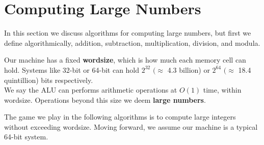 \section{Computing Large Numbers}
\noindent
In this section we discuss algorithms for computing large numbers, but first we define 
algorithmically, addition, subtraction, multiplication, division, and modula.

\begin{Def}[Wordsize]

    Our machine has a fixed \textbf{wordsize}, which is how much each memory cell can hold. Systems like 32-bit or 64-bit can hold $2^{32}$ $(\approx$ 4.3 billion) or $2^{64}$ $(\approx$ 18.4 quintillion) bits respectively.\\

    \noindent
    We say the ALU can performs arithmetic operations at $O(1)$ time, within wordsize. Operations beyond this size we deem \textbf{large numbers}.
\end{Def}
\noindent
The game we play in the following algorithms is to compute large integers without exceeding wordsize. Moving forward, we assume our machine is a typical 64-bit system.

